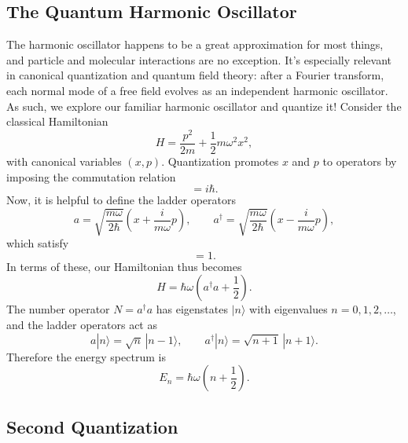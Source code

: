 \subsection{The Quantum Harmonic Oscillator}
\label{sub:qho}

The harmonic oscillator happens to be a great approximation for most things, and particle and molecular interactions are no exception. It's especially relevant in canonical quantization and quantum field theory: after a Fourier transform, each normal mode of a free field evolves as an independent harmonic oscillator. As such, we explore our familiar harmonic oscillator and quantize it! Consider the classical Hamiltonian 
\begin{equation}
H=\frac{p^{2}}{2m}+\frac{1}{2}m\omega^{2}x^{2},
\end{equation}
with canonical variables $(x,p)$. Quantization promotes $x$ and $p$ to operators by imposing the commutation relation
\begin{equation}
[x,p]=i\hbar.
\end{equation}
Now, it is helpful to define the ladder operators
\begin{equation}
a=\sqrt{\frac{m\omega}{2\hbar}}\left(x+\frac{i}{m\omega}p\right),
\qquad
a^{\dagger}=\sqrt{\frac{m\omega}{2\hbar}}\left(x-\frac{i}{m\omega}p\right),
\end{equation}
which satisfy
\begin{equation}
[a,a^{\dagger}]=1.
\end{equation}
In terms of these, our Hamiltonian thus becomes
\begin{equation}
H=\hbar\omega\left(a^{\dagger}a+\frac{1}{2}\right).
\end{equation}
The number operator $N=a^{\dagger}a$ has eigenstates $|n\rangle$ with eigenvalues $n=0,1,2,\ldots$, and the ladder operators act as
\begin{equation}
a|n\rangle=\sqrt{n}\,|n-1\rangle,\qquad
a^{\dagger}|n\rangle=\sqrt{n+1}\,|n+1\rangle.
\end{equation}
Therefore the energy spectrum is
\begin{equation}
E_n=\hbar\omega\left(n+\frac{1}{2}\right).
\end{equation}




\subsection{Second Quantization}
\label{sub:secondquant}


